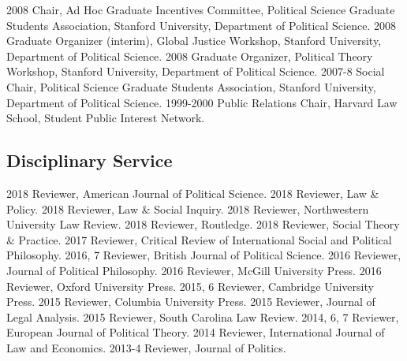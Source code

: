 \documentclass[letterpaper]{moderncv}
\begin{document}
\cvitem
{2008}
{Chair, Ad Hoc Graduate Incentives Committee, Political Science Graduate Students Association, Stanford University, Department of Political Science.}
\vspace{1mm}
\cvitem
{2008}
{Graduate Organizer (interim), Global Justice Workshop, Stanford University, Department of Political Science.}
\vspace{1mm}
\cvitem
{2008}
{Graduate Organizer, Political Theory Workshop, Stanford University, Department of Political Science.}
\vspace{1mm}
\cvitem
{2007-8}
{Social Chair, Political Science Graduate Students Association, Stanford University, Department of Political Science.}
\vspace{1mm}
\cvitem
{1999-2000}
{Public Relations Chair, Harvard Law School, Student Public Interest Network.}
\vspace{1mm}

\subsection{Disciplinary Service}
\cvitem
{2018}
{Reviewer, American Journal of Political Science.}
\vspace{1mm}
\cvitem
{2018}
{Reviewer, Law \& Policy.}
\vspace{1mm}
\cvitem
{2018}
{Reviewer, Law \& Social Inquiry.}
\vspace{1mm}
\cvitem
{2018}
{Reviewer, Northwestern University Law Review.}
\vspace{1mm}
\cvitem
{2018}
{Reviewer, Routledge.}
\vspace{1mm}
\cvitem
{2018}
{Reviewer, Social Theory \& Practice.}
\vspace{1mm}
\cvitem
{2017}
{Reviewer, Critical Review of International Social and Political Philosophy.}
\vspace{1mm}
\cvitem
{2016, 7}
{Reviewer, British Journal of Political Science.}
\vspace{1mm}
\cvitem
{2016}
{Reviewer, Journal of Political Philosophy.}
\vspace{1mm}
\cvitem
{2016}
{Reviewer, McGill University Press.}
\vspace{1mm}
\cvitem
{2016}
{Reviewer, Oxford University Press.}
\vspace{1mm}
\cvitem
{2015, 6}
{Reviewer, Cambridge University Press.}
\vspace{1mm}
\cvitem
{2015}
{Reviewer, Columbia University Press.}
\vspace{1mm}
\cvitem
{2015}
{Reviewer, Journal of Legal Analysis.}
\vspace{1mm}
\cvitem
{2015}
{Reviewer, South Carolina Law Review.}
\vspace{1mm}
\cvitem
{2014, 6, 7}
{Reviewer, European Journal of Political Theory.}
\vspace{1mm}
\cvitem
{2014}
{Reviewer, International Journal of Law and Economics.}
\vspace{1mm}
\cvitem
{2013-4}
{Reviewer, Journal of Politics.}
\vspace{1mm}
\end{document}
